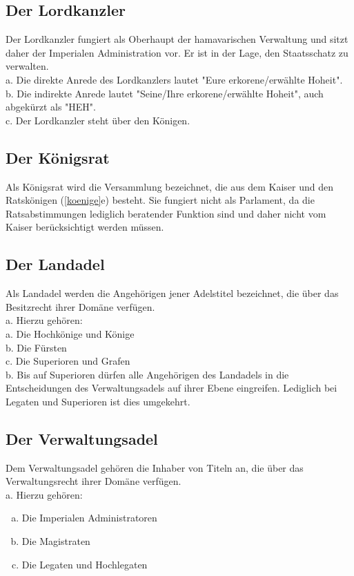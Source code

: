 \documentclass{article}
\begin{document}
\subsection{Der Lordkanzler}
Der Lordkanzler fungiert als Oberhaupt der hamavarischen Verwaltung und sitzt daher der Imperialen Administration vor. Er ist in der Lage, den Staatsschatz zu verwalten. \\
a. Die direkte Anrede des Lordkanzlers lautet "Eure erkorene/erwählte Hoheit".\\
b. Die indirekte Anrede lautet "Seine/Ihre erkorene/erwählte Hoheit", auch abgekürzt als "HEH".\\
c. Der Lordkanzler steht über den Königen.

\subsection{Der Königsrat }
Als Königsrat wird die Versammlung bezeichnet, die aus dem Kaiser und den Ratskönigen (\ref{koenige}e) besteht. Sie fungiert nicht als Parlament, da die Ratsabstimmungen lediglich beratender Funktion sind und daher nicht vom Kaiser berücksichtigt werden müssen.  

\subsection{Der Landadel}
Als Landadel werden die Angehörigen jener Adelstitel bezeichnet, die über das Besitzrecht ihrer Domäne verfügen.\\
a. Hierzu gehören: \\
a. Die Hochkönige und Könige  \\
b. Die Fürsten  \\
c. Die Superioren und Grafen  \\
b. Bis auf Superioren dürfen alle Angehörigen des Landadels in die Entscheidungen des Verwaltungsadels auf ihrer Ebene eingreifen. Lediglich bei Legaten und Superioren ist dies umgekehrt.

\subsection{Der Verwaltungsadel}
Dem Verwaltungsadel gehören die Inhaber von Titeln an, die über das Verwaltungsrecht ihrer Domäne verfügen.  \\
a. Hierzu gehören:
\begin{enumerate}[a)]
	\item Die Imperialen Administratoren
	\item Die Magistraten
	\item Die Legaten und Hochlegaten
\end{enumerate}
\end{document}
